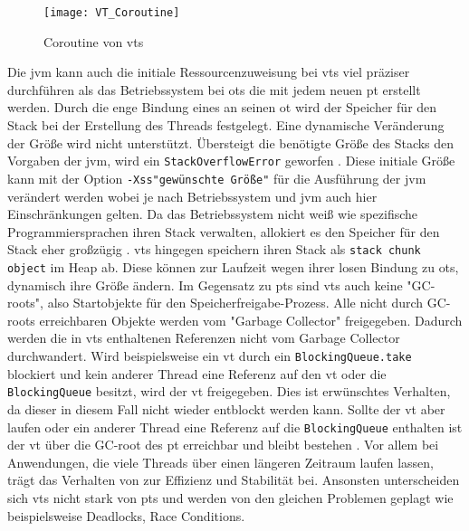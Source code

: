     \begin{figure}[H]
        \centering
        \texttt{[image: VT\_Coroutine]}
        \caption{Coroutine von \Glspl{vt}}
        \label{fig:VT_Coroutine}
    \end{figure}

    Die \gls{jvm} kann auch die initiale Ressourcenzuweisung bei \Glspl{vt} viel präziser durchführen als das Betriebssystem bei \Glspl{ot} die mit jedem neuen \gls{pt}
    erstellt werden. Durch die enge Bindung eines  an seinen \gls{ot} wird der Speicher für den Stack bei der Erstellung des Threads festgelegt.
    Eine dynamische Veränderung der Größe wird nicht unterstützt. Übersteigt die benötigte Größe des Stacks den Vorgaben der \gls{jvm}, wird ein \texttt{StackOverflowError}
    geworfen \cite{jvmSpecification}. Diese initiale Größe kann mit der Option \texttt{-Xss"gewünschte Größe"} für die Ausführung der \gls{jvm} verändert werden wobei 
    je nach Betriebssystem und \gls{jvm} auch hier Einschränkungen gelten. Da das Betriebssystem nicht weiß wie spezifische Programmiersprachen ihren Stack verwalten, allokiert
    es den Speicher für den Stack eher großzügig \cite{ProjectLoom}.
    \Glspl{vt} hingegen speichern ihren Stack als \texttt{stack chunk object} im Heap ab. Diese können zur Laufzeit wegen ihrer losen Bindung zu \Glspl{ot},
    dynamisch ihre Größe ändern. 
    Im Gegensatz zu \Glspl{pt} sind \Glspl{vt} auch keine "GC-roots", also Startobjekte für den Speicherfreigabe-Prozess. Alle nicht durch GC-roots erreichbaren
    Objekte werden vom "Garbage Collector" freigegeben. Dadurch werden die in \Glspl{vt} enthaltenen
    Referenzen nicht vom Garbage Collector durchwandert. Wird beispielsweise ein \gls{vt} durch ein \texttt{BlockingQueue.take} blockiert und kein anderer Thread eine
    Referenz auf den \gls{vt} oder die \texttt{BlockingQueue} besitzt, wird der \gls{vt} freigegeben. Dies ist erwünschtes Verhalten, da dieser in diesem Fall 
    nicht wieder entblockt werden kann. Sollte der \gls{vt} aber laufen oder ein anderer Thread eine Referenz auf die \texttt{BlockingQueue} enthalten ist der 
    \gls{vt} über die GC-root des \gls{pt} erreichbar und bleibt bestehen \cite{JEP444}.
    Vor allem bei Anwendungen, die viele Threads über einen längeren Zeitraum  laufen lassen, trägt das Verhalten von  zur Effizienz und Stabilität bei.
    Ansonsten unterscheiden sich \Glspl{vt} nicht stark von \Glspl{pt} und werden von den gleichen Problemen geplagt wie beispielsweise Deadlocks, Race Conditions\cite{JEP425}.


